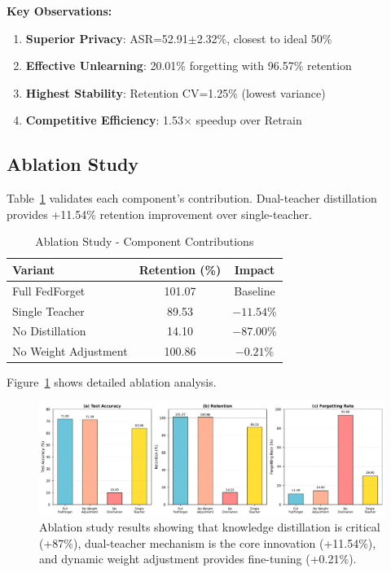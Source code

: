 \documentclass[10pt,twocolumn]{article}
\begin{document}
\textbf{Key Observations:}

\begin{enumerate}
\item \textbf{Superior Privacy}: ASR=52.91$\pm$2.32\%, closest to ideal 50\%
\item \textbf{Effective Unlearning}: 20.01\% forgetting with 96.57\% retention
\item \textbf{Highest Stability}: Retention CV=1.25\% (lowest variance)
\item \textbf{Competitive Efficiency}: 1.53$\times$ speedup over Retrain
\end{enumerate}

\subsection{Ablation Study}

Table~\ref{tab:ablation} validates each component's contribution. Dual-teacher distillation provides +11.54\% retention improvement over single-teacher.

\begin{table}[t]
\centering
\caption{Ablation Study - Component Contributions}
\label{tab:ablation}
\begin{tabular}{lcc}
\toprule
Variant & Retention (\%) & Impact \\
\midrule
Full FedForget & 101.07 & Baseline \\
Single Teacher & 89.53 & $-11.54$\% \\
No Distillation & 14.10 & $-87.00$\% \\
No Weight Adjustment & 100.86 & $-0.21$\% \\
\bottomrule
\end{tabular}
\end{table}

Figure~\ref{fig:ablation} shows detailed ablation analysis.

\begin{figure}[htbp]
\centering
\includegraphics[width=\columnwidth]{figures/figure2_ablation_study.pdf}
\caption{Ablation study results showing that knowledge distillation is critical (+87\%), dual-teacher mechanism is the core innovation (+11.54\%), and dynamic weight adjustment provides fine-tuning (+0.21\%).}
\label{fig:ablation}
\end{figure}
\end{document}
